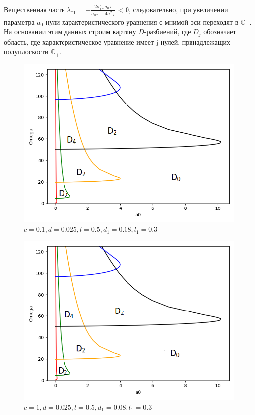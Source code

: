 \documentclass[12pt, a4paper]{extarticle}
\begin{document}
Вещественная часть $\lambda_{*1} = -\frac{2 \sigma_{1*}^2 a_{0*}}{a_{0*} + 4\sigma_{1*}^2}$ < 0, следовательно, при увеличении параметра $a_{0}$ нули характеристического уравнения с мнимой оси переходят в $\mathbb {C}_{-}$. На основании этим данных строим картину $D$-разбиений, где $D_{j}$ обозначает область, где характеристическое уравнение имеет j нулей, принадлежащих полуплоскости $\mathbb {C}_{+}$.
\\
\begin{figure}[h!]
 \centering
 \includegraphics[scale=0.8]{D-razb_c=0.1}
 \caption{$c=0.1, d=0.025, l=0.5, d_1=0.08, l_1=0.3$}
\end{figure}
\begin{figure}[h!]
 \centering
 \includegraphics[scale=0.8]{D-razb_c=1}
 \caption{$c=1, d=0.025, l=0.5, d_1=0.08, l_1=0.3$}
\end{figure}
\end{document}
